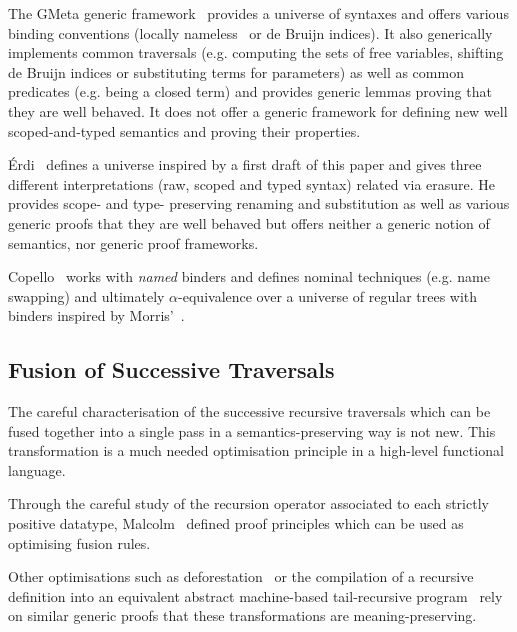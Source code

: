 {The GMeta generic framework~\citeyear{gmeta} provides a universe of syntaxes
and offers various binding conventions (locally nameless~\cite{Chargueraud2012}
or de Bruijn indices). It also generically implements common traversals (e.g. computing
the sets of free variables,
shifting
de Bruijn indices or substituting terms for parameters) as well as common
predicates (e.g. being a closed term) and provides generic lemmas proving that
they are well behaved. It does not offer a generic framework
for defining new well scoped-and-typed semantics and proving their properties.

Érdi~\citeyear{gergodraft} defines a universe inspired by a first draft of this
paper and gives three different interpretations (raw, scoped and typed syntax)
related via erasure. He provides scope- and type- preserving renaming and
substitution as well as various generic proofs that they are well behaved but
offers neither a generic notion of semantics, nor generic proof frameworks.

Copello~\citeyear{copello2017} works with \emph{named} binders and
defines nominal techniques (e.g. name swapping) and ultimately $\alpha$-equivalence
over a universe of regular trees with binders inspired by Morris'~\citeyear{morris-regulartt}.

\subsection{Fusion of Successive Traversals}

The careful characterisation of the successive recursive traversals which can be
fused together into a single pass in a semantics-preserving way is not new. This
transformation is a much needed optimisation principle in a high-level functional
language.

Through the careful study of the recursion operator associated to each strictly
positive datatype, Malcolm~\citeyear{DBLP:journals/scp/Malcolm90} defined proof
principles which can be used as optimising fusion rules.

Other optimisations such as deforestation~\cite{DBLP:journals/tcs/Wadler90}
or the compilation of a recursive definition into an equivalent abstract
machine-based tail-recursive program~\cite{DBLP:conf/icfp/CortinasS18}
rely on similar generic proofs that these transformations are meaning-preserving.




}
